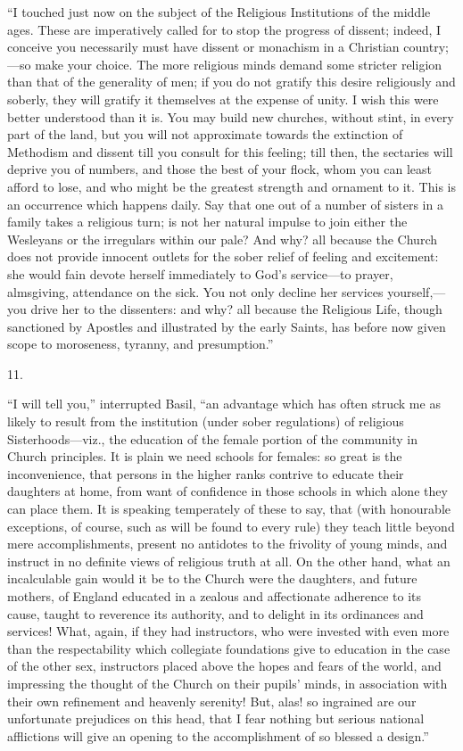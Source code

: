 ``I touched just now on the subject of the
Religious Institutions of the middle ages. These are imperatively
called for to stop the progress of dissent; indeed, I conceive you
necessarily must have dissent or monachism in a Christian
country;—so make your choice. The more religious minds demand some
stricter religion than that of the generality of men; if you do not
gratify this desire religiously and soberly, they will gratify it
themselves at the expense of unity. I wish this were better understood
than it is. You may build new churches, without stint, in every part
of the land, but you will not approximate towards the extinction of
Methodism and dissent till you consult for this feeling; till then,
the sectaries will deprive you of numbers, and those the best of your
flock, whom you can least afford to lose, and who might be the
greatest strength and ornament to it. This is an occurrence which
happens daily. Say that one out of a number of sisters in a family
takes a religious turn; is not her natural impulse to join either the
Wesleyans or the irregulars within our pale? And why? all because the
Church does not provide innocent outlets for the sober relief of
feeling and excitement: she would fain devote herself immediately to
God's service—to prayer, almsgiving, attendance on the sick. You not
only decline her services yourself,—you drive her to the dissenters:
and why? all because the Religious Life, though sanctioned by Apostles
and illustrated by the early Saints, has before now given scope to
moroseness, tyranny, and presumption.''

11.

``I will tell you,'' interrupted Basil, ``an
advantage which has often struck me as likely to result from the
institution (under sober regulations) of religious Sisterhoods—viz.,
the education of the female portion of the community in Church
principles. It is plain we need schools for females: so great is the
inconvenience, that persons in the higher ranks contrive to educate
their daughters at home, from want of confidence in those schools in
which alone they can place them. It is speaking temperately of these
to say, that (with honourable exceptions, of course, such as will be
found to every rule) they teach little beyond mere accomplishments,
present no antidotes to the frivolity of young minds, and instruct in
no definite views of religious truth at all. On the other hand, what
an incalculable gain would it be to the Church were the daughters, and
future mothers, of England educated in a zealous and affectionate
adherence to its cause, taught to reverence its authority, and to
delight in its ordinances and services! What, again, if they had
instructors, who were invested with even more than the respectability
which collegiate foundations give to education in the case of the
other sex, instructors placed above the hopes and fears of the world,
and impressing the thought of the Church on their pupils' minds,
in association with their own refinement and heavenly serenity! But,
alas! so ingrained are our unfortunate prejudices on this head, that I
fear nothing but serious national afflictions will give an opening to
the accomplishment of so blessed a design.''

